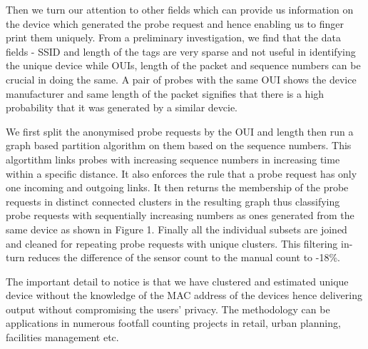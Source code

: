 \documentclass[11t, a4paper, twocolumn]{article}
\begin{document}
	Then we turn our attention to other fields which can provide us information
	on the device which generated the probe request and hence enabling us to 
	finger print them uniquely.
	From a preliminary investigation, we find that the data fields - SSID and length of
	the tags are very sparse and not useful in identifying the unique device while 
	OUIs, length of the packet and sequence numbers can be crucial in doing the same.
	A pair of probes with the same OUI shows the device manufacturer and same length of the packet signifies that 
	there is a high probability that it was generated by a similar devcie.
	
	We first split the anonymised probe requests by the OUI and length then run a 
	graph based partition algorithm on them based on the sequence numbers. This 
	algortithm links probes with increasing sequence numbers in increasing time within a
	specific distance. It also enforces the rule that a probe request has only one 
	incoming and outgoing links. It then returns the membership of the probe requests in
	distinct connected clusters in the resulting graph thus classifying probe requests
	with sequentially increasing numbers as ones generated from the same device as shown in Figure 1. Finally
	all the individual subsets are joined and cleaned for repeating probe requests with
	unique clusters. This filtering in-turn reduces the difference of the sensor count to the manual count to 
	-18\%.

	The important detail to notice is that we have clustered and estimated unique device
	without the knowledge of the MAC address of the devices hence delivering output 
	without compromising the users' privacy. The methodology can be applications in 
	numerous footfall counting projects in retail, urban planning, facilities management etc.
	

	\printbibliography[title={References}]
\end{document}
